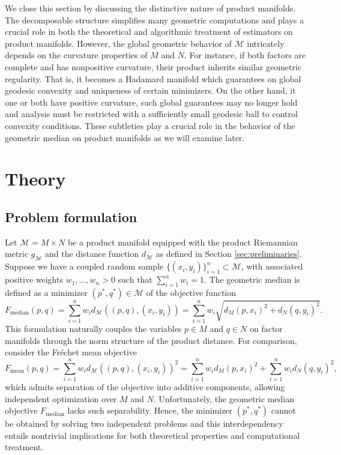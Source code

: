\documentclass[10pt]{article}
\newcommand{\calM}{\mathcal{M}}
\newcommand{\Frechet}{Fr\'{e}chet\xspace}
\begin{document}
We close this section by discussing the distinctive nature of product manifolds. The decomposable structure simplifies many geometric computations and plays a crucial role in both the theoretical and algorithmic treatment of estimators on product manifolds. However, the global geometric behavior of $\calM$ intricately depends on the curvature properties of $M$ and $N$. For instance, if both factors are complete and has nonpositive curvature, their product inherits similar geometric regularity. That is, it becomes a Hadamard manifold which guarantees on global geodesic convexity and uniqueness of certain minimizers. On the other hand, it one or both have positive curvature, such global guarantees may no longer hold and analysis must be restricted with a sufficiently small geodesic ball to control convexity conditions. These subtleties play a crucial role in the behavior of the geometric median on product manifolds as we will examine later.

\section{Theory}\label{sec:theory}

\subsection{Problem formulation}

Let $\calM = M\times N$ be a product manifold equipped with the product Riemannian metric $g_\calM$ and the distance function $d_\calM$ as defined in Section \ref{sec:preliminaries}. Suppose we have a coupled random sample $\lbrace (x_i, y_i)\rbrace_{i=1}^n \subset \calM$, with associated positive weights $w_1, \ldots, w_n > 0$ such that $\sum_{i=1}^n w_i = 1$. The geometric median is defined as a minimizer $(p^*,q^*) \in \calM$ of the objective function
\begin{equation}\label{def:objective_median} 
	F_{\text{median}}(p,q) = \sum_{i=1}^n w_i d_\calM((p,q), (x_i,y_i)) 
	=\sum_{i=1}^n w_i  \sqrt{d_M(p,x_i)^2 + d_N(q,y_i)^2}.
\end{equation}
This formulation naturally couples the variables $p\in M$ and $q\in N$ on factor manifolds through the norm structure of the product distance. For comparison, consider the \Frechet mean objective 
\begin{equation*}
	F_{\text{mean}}(p,q) = 
	\sum_{i=1}^n w_i d_\calM((p,q), (x_i,y_i))^2 =
	\sum_{i=1}^n w_i  d_M(p,x_i)^2 + \sum_{i=1}^n w_i d_N(q,y_i)^2,
\end{equation*}
which admits separation of the objective into additive components, allowing independent optimization over $M$ and $N$. Unfortunately, the geometric median objective $F_{\text{median}}$ lacks such separability. Hence, the minimizer $(p^*,q^*)$ cannot be obtained by solving two independent problems and this interdependency entails nontrivial implications for both theoretical properties and computational treatment. 
\end{document}
